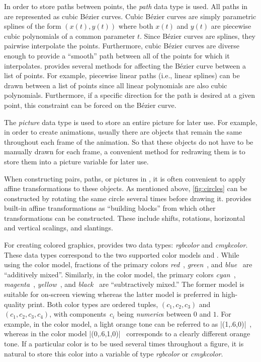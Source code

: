 In order to store paths between points, the \textit{path} data type is
used.  All paths in \MP{} are represented as cubic B\'{e}zier curves.
Cubic B\'{e}zier curves are simply parametric splines of the form
$(x(t),y(t))$ where both $x(t)$ and $y(t)$ are piecewise cubic
polynomials of a common parameter $t$.  Since B\'{e}zier curves are
splines, they pairwise interpolate the points.  Furthermore, cubic
B\'{e}zier curves are diverse enough to provide a ``smooth'' path
between all of the points for which it interpolates.  \MP{} provides
several methods for affecting the B\'{e}zier curve between a list of
points.  For example, piecewise linear paths (i.e., linear splines) can
be drawn between a list of points since all linear polynomials are also
cubic polynomials.  Furthermore, if a specific direction for the path is
desired at a given point, this constraint can be forced on the
B\'{e}zier curve.

The \textit{picture} data type is used to store an entire picture for
later use.  For example, in order to create animations, usually there
are objects that remain the same throughout each frame of the animation.
So that these objects do not have to be manually drawn for each frame, a
convenient method for redrawing them is to store them into a picture
variable for later use.

When constructing pairs, paths, or pictures in \MP{}, it is often
convenient to apply affine transformations to these objects.  As
mentioned above, \autoref{fig:circles} can be constructed by rotating
the same circle several times before drawing it.  \MP{} provides
built-in affine transformations as ``building blocks'' from which other
transformations can be constructed.  These include shifts, rotations,
horizontal and vertical scalings, and slantings.

For creating colored graphics, \MP{} provides two data types:
\textit{rgbcolor} and \textit{cmykcolor}.  These data types correspond
to the two supported color models \RGB{} and \CMYK.  While using the
\RGB{} color model, fractions of the primary colors
\textit{red}~, \textit{green}~, and
\textit{blue}~ are ``additively mixed''.  Similarly, in
the \CMYK{} color model, the primary colors
\textit{cyan}~, \textit{magenta}~,
\textit{yellow}~, and \textit{black}~ are
``subtractively mixed.''  The former model is suitable for on-screen
viewing whereas the latter model is preferred in high-quality print.
Both color types are ordered tuples, $(c_1,c_2,c_3)$ and
$(c_1,c_2,c_3,c_4)$, with components~$c_i$ being \textit{numeric}s
between $0$ and $1$.  For example, in the \RGB{} color model, a light
orange tone can be referred to as |(1,.6,0)|~,
whereas in the \CMYK{} color model |(0,.6,1,0)|~
corresponds to a clearly different orange tone.  If a particular color
is to be used several times throughout a figure, it is natural to store
this color into a variable of type \textit{rgbcolor} or
\textit{cmykcolor}.

